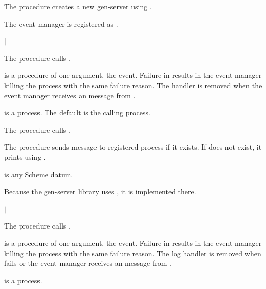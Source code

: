 The  procedure creates a new
 gen-server using .

The event manager is registered as .

\begin{procedure}
\end{procedure}
\returns{}  $|$ 

The  procedure calls
.

 is a procedure of one argument, the event. Failure in
 results in the event manager killing the 
process with the same failure reason. The handler is removed when the
event manager receives an  message from .

 is a process. The default is the calling process.

\begin{procedure}
\end{procedure}
\returns{} 

The  procedure calls
.

\begin{procedure}
\end{procedure}
\returns{} 

The  procedure sends message
 to registered process
 if it exists. If  does not exist,
it prints  using
.

 is any Scheme datum.

Because the gen-server library uses , it is
implemented there.

\begin{procedure}
\end{procedure}
\returns{}  $|$ 

The  procedure calls
.

 is a procedure of one argument, the event. Failure in
 results in the event manager killing the 
process with the same failure reason. The log handler is removed when
 fails or the event manager receives an 
message from .

 is a process.
